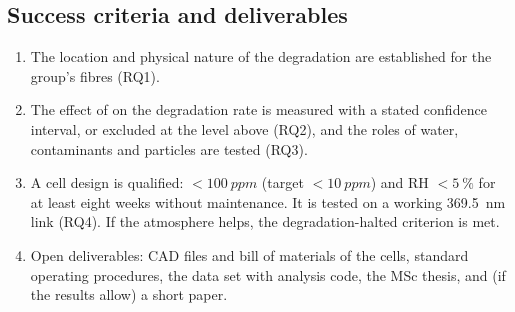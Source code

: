 \subsection{Success criteria and deliverables}
\begin{enumerate}[label=\textbf{S\arabic*}]
  \item The location and physical nature of the degradation are established for the group's fibres (RQ1).
  \item The effect of \Oxy{} on the degradation rate is measured with a stated confidence interval, or
        excluded at the level above (RQ2), and the roles of water, contaminants and particles are tested (RQ3).
  \item A cell design is qualified: \Oxy{} $<\SI{100}{ppm}$ (target $<\SI{10}{ppm}$) and RH
        $<\SI{5}{\percent}$ for at least eight weeks without maintenance. It is tested on a working
        \SI{369.5}{nm} link (RQ4). If the atmosphere helps, the degradation-halted criterion is met.
  \item Open deliverables: CAD files and bill of materials of the cells, standard operating procedures, the
        data set with analysis code, the MSc thesis, and (if the results allow) a short paper.
\end{enumerate}
